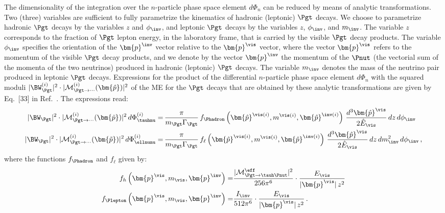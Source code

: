 {The dimensionality of the integration over the $n$-particle phase space element $d\Phi_{n}$ 
can be reduced by means of analytic transformations. 
Two (three) variables are sufficient to fully parametrize the kinematics of hadronic (leptonic) $\Pgt$ decays.
We choose to parametrize hadronic $\Pgt$ decays by the variables $z$ and $\phi_{\inv}$,
and leptonic $\Pgt$ decays by the variables $z$, $\phi_{\inv}$, and $m_{\inv}$.
The variable $z$ corresponds to the fraction of $\Pgt$ lepton energy, in the laboratory frame, that is carried by the visible $\Pgt$ decay products.
The variable $\phi_{\inv}$ specifies the orientation of the $\bm{p}^{\inv}$ vector relative to the $\bm{p}^{\vis}$ vector,
where the vector $\bm{p}^{\vis}$ refers to the momentum of the visible $\Pgt$ decay products,
and we denote by the vector $\bm{p}^{\inv}$ the momentum of the $\Pnut$ (the vectorial sum of the momenta of the two neutrinos) produced in hadronic (leptonic) $\Pgt$ decays.
The variable $m_{\inv}$ denotes the mass of the neutrino pair produced in leptonic $\Pgt$ decays.
Expressions for the product of the differential $n$-particle phase space element $d\Phi_{n}$ 
with the squared moduli $\vert \BW^{(i)}_{\Pgt} \vert^{2} \cdot \vert \mathcal{M}^{(i)}_{\Pgt\to\cdots}(\bm{\hat{p}}) \vert^{2}$ 
of the ME for the $\Pgt$ decays that are obtained by these analytic transformations are given by Eq.~[33] in Ref.~\cite{SVfitMEM}.
The expressions read:
\begin{align}
\vert \BW_{\Pgt} \vert^{2} \cdot \vert \mathcal{M}^{(i)}_{\Pgt\to\cdots}(\bm{\tilde{p}}) \vert^{2} \, d\Phi^{(i)}_{\tauhnu} 
 = & \, \frac{\pi}{m_{\Pgt}\Gamma_{\Pgt}} \,
 f_{\Phadron}\left(\bm{\hat{p}}^{\vis(i)}, m^{\vis(i)},
   \bm{\hat{p}}^{\inv(i)}\right) \, \frac{d^{3}\bm{\hat{p}}^{\vis}}{2 \hat{E}_{\vis}} \, dz \, d\phi_{\inv} \nonumber \\
\vert \BW_{\Pgt} \vert^{2} \cdot \vert \mathcal{M}^{(i)}_{\Pgt\to\cdots}(\bm{\tilde{p}}) \vert^{2} \, d\Phi^{(i)}_{\ellnunu} 
 = & \, \frac{\pi}{m_{\Pgt}\Gamma_{\Pgt}} \, f_{\ell}\left(\bm{\hat{p}}^{\vis(i)},
 m^{\vis(i)}, \bm{\hat{p}}^{\inv(i)}\right) \, \frac{d^{3}\bm{\hat{p}}^{\vis}}{2 \hat{E}_{\vis}} \, dz \, dm^{2}_{\inv} \, d\phi_{\inv}
 \nonumber \, ,
\end{align}
where the functions $f_{\Phadron}$ and $f_{\ell}$ given by:
\begin{align}
f_{h}\left(\bm{p}^{\vis}, m_{\vis}, \bm{p}^{\inv}\right) = &
  \frac{\vert\mathcal{M}^{\eff}_{\Pgt \to \tauh\Pnut}\vert^{2}}{256\pi^{6}} \cdot \frac{E_{\vis}}{\vert\bm{p}^{\vis}\vert \, z^{2}} \nonumber \\
f_{\Plepton}\left(\bm{p}^{\vis}, m_{\vis}, \bm{p}^{\inv}\right) = &
  \frac{I_{\inv}}{512\pi^{6}} \cdot \frac{E_{\vis}}{\vert\bm{p}^{\vis}\vert \, z^{2}} \nonumber \, . 
\end{align}

}
